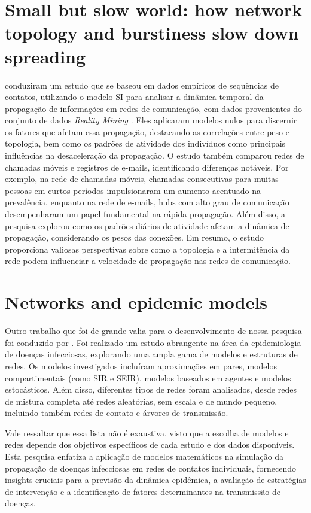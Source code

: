 \section{Small but slow world: how network topology and burstiness slow down spreading}

 conduziram um estudo que se baseou em dados empíricos de sequências de contatos, utilizando o modelo SI para analisar a dinâmica temporal da propagação de informações em redes de comunicação, com dados provenientes do conjunto de dados \textit{Reality Mining} \cite{Eagle2006}. Eles aplicaram modelos nulos para discernir os fatores que afetam essa propagação, destacando as correlações entre peso e topologia, bem como os padrões de atividade dos indivíduos como principais influências na desaceleração da propagação. O estudo também comparou redes de chamadas móveis e registros de e-mails, identificando diferenças notáveis. Por exemplo, na rede de chamadas móveis, chamadas consecutivas para muitas pessoas em curtos períodos impulsionaram um aumento acentuado na prevalência, enquanto na rede de e-mails, hubs com alto grau de comunicação desempenharam um papel fundamental na rápida propagação. Além disso, a pesquisa explorou como os padrões diários de atividade afetam a dinâmica de propagação, considerando os pesos das conexões. Em resumo, o estudo proporciona valiosas perspectivas sobre como a topologia e a intermitência da rede podem influenciar a velocidade de propagação nas redes de comunicação.

\section{Networks and epidemic models}

Outro trabalho que foi de grande valia para o desenvolvimento de nossa pesquisa foi conduzido por . Foi realizado um estudo abrangente na área da epidemiologia de doenças infecciosas, explorando uma ampla gama de modelos e estruturas de redes. Os modelos investigados incluíram aproximações em pares, modelos compartimentais (como SIR e SEIR), modelos baseados em agentes e modelos estocásticos. Além disso, diferentes tipos de redes foram analisados, desde redes de mistura completa até redes aleatórias, sem escala e de mundo pequeno, incluindo também redes de contato e árvores de transmissão.

Vale ressaltar que essa lista não é exaustiva, visto que a escolha de modelos e redes depende dos objetivos específicos de cada estudo e dos dados disponíveis. Esta pesquisa enfatiza a aplicação de modelos matemáticos na simulação da propagação de doenças infecciosas em redes de contatos individuais, fornecendo insights cruciais para a previsão da dinâmica epidêmica, a avaliação de estratégias de intervenção e a identificação de fatores determinantes na transmissão de doenças.

